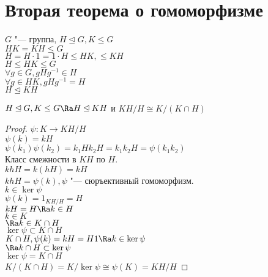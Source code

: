 ﻿\section{Вторая теорема о гомоморфизме}
$G$ "--- группа, $H \unlhd G, K \le G$\\
$HK = KH \le G$\\
$H = H \cdot 1 = 1 \cdot H \le HK, \le KH$\\

$H \le HK \le G$\\
$\forall g \in G, gHg^{-1} \in H$\\
$\forall g \in HK, gHg^{-1} = H$\\
$H \unlhd KH$\\
\begin{theorem}
$H \unlhd G, K \le G \Ra H \unlhd KH$ и $KH/H \cong K/(K \cap H)$\\
\end{theorem}
\begin{proof}
$\psi \colon K \to KH/H$\\
$\psi(k) = kH$\\
$\psi(k_1)\psi(k_2) = k_1Hk_2H = k_1k_2H = \psi(k_1k_2)$\\

Класс смежности в $KH$ по $H$.\\
$khH = k(hH) = kH$\\
$khH = \psi(k), \psi$ "--- сюръективный гомоморфизм.\\

$k \in \ker \psi$\\
$\psi(k) = 1_{KH/H} = H$\\
$kH = H \Ra k \in H$\\
$k \in K$\\
$\Ra k \in  K \cap H$\\

$\ker \psi \subset K \cap H$\\
$K \cap H, \psi(k) = kH = H1 \Ra k \in \ker \psi$\\
$\Ra k \cap H \subset \ker \psi$\\
$\ker \psi = K \cap H$\\

$K/(K \cap H) = K/\ker \psi \cong \psi(K) = KH/H$
\end{proof}
